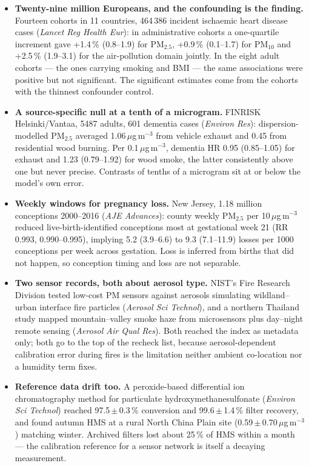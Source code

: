 \documentclass[10pt]{article}
\begin{document}
\footnotesize
\begin{itemize}

\item \textbf{Twenty-nine million Europeans, and the confounding is the finding.} Fourteen cohorts in 11 countries, 464\,386 incident ischaemic heart disease cases (\textit{Lancet Reg Health Eur}): in administrative cohorts a one-quartile increment gave +1.4\,\% (0.8--1.9) for PM$_{2.5}$, +0.9\,\% (0.1--1.7) for PM$_{10}$ and +2.5\,\% (1.9--3.1) for the air-pollution domain jointly. In the eight adult cohorts --- the ones carrying smoking and BMI --- the same associations were positive but not significant. The significant estimates come from the cohorts with the thinnest confounder control.

\item \textbf{A source-specific null at a tenth of a microgram.} FINRISK Helsinki/Vantaa, 5487 adults, 601 dementia cases (\textit{Environ Res}): dispersion-modelled PM$_{2.5}$ averaged 1.06\,$\mu$g\,m$^{-3}$ from vehicle exhaust and 0.45 from residential wood burning. Per 0.1\,$\mu$g\,m$^{-3}$, dementia HR 0.95 (0.85--1.05) for exhaust and 1.23 (0.79--1.92) for wood smoke, the latter consistently above one but never precise. Contrasts of tenths of a microgram sit at or below the model's own error.

\item \textbf{Weekly windows for pregnancy loss.} New Jersey, 1.18 million conceptions 2000--2016 (\textit{AJE Advances}): county weekly PM$_{2.5}$ per 10\,$\mu$g\,m$^{-3}$ reduced live-birth-identified conceptions most at gestational week 21 (RR 0.993, 0.990--0.995), implying 5.2 (3.9--6.6) to 9.3 (7.1--11.9) losses per 1000 conceptions per week across gestation. Loss is inferred from births that did not happen, so conception timing and loss are not separable.

\item \textbf{Two sensor records, both about aerosol type.} NIST's Fire Research Division tested low-cost PM sensors against aerosols simulating wildland--urban interface fire particles (\textit{Aerosol Sci Technol}), and a northern Thailand study mapped mountain--valley smoke haze from microsensors plus day--night remote sensing (\textit{Aerosol Air Qual Res}). Both reached the index as metadata only; both go to the top of the recheck list, because aerosol-dependent calibration error during fires is the limitation neither ambient co-location nor a humidity term fixes.

\item \textbf{Reference data drift too.} A peroxide-based differential ion chromatography method for particulate hydroxymethanesulfonate (\textit{Environ Sci Technol}) reached 97.5\,$\pm$\,0.3\,\% conversion and 99.6\,$\pm$\,1.4\,\% filter recovery, and found autumn HMS at a rural North China Plain site (0.59\,$\pm$\,0.70\,$\mu$g\,m$^{-3}$) matching winter. Archived filters lost about 25\,\% of HMS within a month --- the calibration reference for a sensor network is itself a decaying measurement.


\end{itemize}
\end{document}
